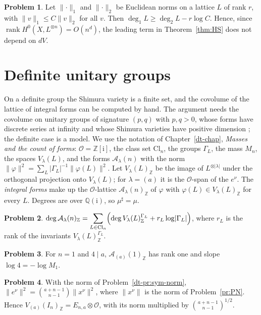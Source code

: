 \documentclass[reqno]{amsart}
\newcounter{chap}
\theoremstyle{definition}
\newtheorem{problem}{Problem}[section]
\theoremstyle{plain}
\newcommand{\Z}{\mathbb{Z}}
\newcommand{\Q}{\mathbb{Q}}
\newcommand{\Oc}{\mathcal{O}}
\newcommand{\Ac}{\mathcal{A}}
\newcommand{\ii}{\mathrm{i}}
\newcommand{\Cl}{\mathrm{Cl}}
\begin{document}
\begin{problem}\label{pr:L2-sup}
Let \(\lVert\cdot\rVert_1\) and \(\lVert\cdot\rVert_2\) be Euclidean norms on a lattice \(L\) of rank \(r\), with \(\lVert v \rVert_1 \le C\lVert v \rVert_2\) for all \(v\).  Then \(\deg_1 L \ge \deg_2 L - r\log C\).  Hence, since \(\operatorname{rank} H^0(X, L^{\otimes n}) = O(n^d)\), the leading term in Theorem~\ref{thm:HS} does not depend on \(dV\).
\end{problem}

\section{Definite unitary groups}\label{sec:definite}

On a definite group the Shimura variety is a finite set, and the covolume of the lattice of integral forms can be computed by hand.  The argument needs the covolume on unitary groups of signature \((p, q)\) with \(p, q > 0\), whose forms have discrete series at infinity and whose Shimura varieties have positive dimension \cite[\S15.14 and Hyp.~15.58]{Adr}; the definite case is a model.  We use the notation of Chapter~\ref{dt-chap}, \emph{Masses and the count of forms}: \(\Oc = \Z[\ii]\), the class set \(\Cl_n\), the groups \(\Gamma_L\), the mass \(M_n\), the spaces \(V_\lambda(L)\), and the forms \(\Ac_\lambda(n)\) with the norm \(\lVert\varphi\rVert^2 = \sum_L \lvert\Gamma_L\rvert^{-1}\lVert\varphi(L)\rVert^2\).  Let \(V_\lambda(L)_\Z\) be the image of \(L^{\otimes\lvert\lambda\rvert}\) under the orthogonal projection onto \(V_\lambda(L)\); for \(\lambda = (a)\) it is the \(\Oc\)-span of the \(e^\nu\).  The \emph{integral forms} make up the \(\Oc\)-lattice \(\Ac_\lambda(n)_\Z\) of \(\varphi\) with \(\varphi(L) \in V_\lambda(L)_\Z\) for every \(L\).  Degrees are over \(\Q(\ii)\), so \(\mu^\sharp = \mu\).

\begin{problem}\label{pr:def-deg}
\(\displaystyle \deg \Ac_\lambda(n)_\Z = \sum_{L \in \Cl_n} \Bigl( \deg V_\lambda(L)_\Z^{\Gamma_L} + r_L \log\lvert\Gamma_L\rvert \Bigr)\), where \(r_L\) is the rank of the invariants \(V_\lambda(L)_\Z^{\Gamma_L}\).
\end{problem}

\begin{problem}\label{pr:def-n1}
For \(n = 1\) and \(4 \mid a\), \(\Ac_{(a)}(1)_\Z\) has rank one and slope \(\log 4 = -\log M_1\).
\end{problem}

\begin{problem}\label{pr:sym-sphere}
With the norm of Problem~\ref{dt-pr:sym-norm}, \(\lVert e^\nu \rVert^2 = \binom{a+n-1}{n-1} \lVert x^\nu \rVert^2\), where \(\lVert x^\nu \rVert\) is the norm of Problem~\ref{pr:PN}.  Hence \(V_{(a)}(I_n)_\Z = E_{n,a} \otimes \Oc\), with its norm multiplied by \(\binom{a+n-1}{n-1}^{1/2}\).
\end{problem}
\end{document}
